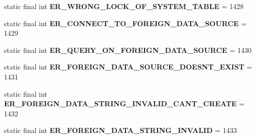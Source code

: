 \begin{DoxyCompactItemize}
\item 
\mbox{\label{classcom_1_1mysql_1_1cj_1_1exceptions_1_1_mysql_error_numbers_aa5a5b3c1b43622de8af2e0ab8a732bf4}} 
static final int {\bfseries E\+R\+\_\+\+W\+R\+O\+N\+G\+\_\+\+L\+O\+C\+K\+\_\+\+O\+F\+\_\+\+S\+Y\+S\+T\+E\+M\+\_\+\+T\+A\+B\+LE} = 1428
\item 
\mbox{\label{classcom_1_1mysql_1_1cj_1_1exceptions_1_1_mysql_error_numbers_a62dc42122c8ce3b2b13b38091908f2ee}} 
static final int {\bfseries E\+R\+\_\+\+C\+O\+N\+N\+E\+C\+T\+\_\+\+T\+O\+\_\+\+F\+O\+R\+E\+I\+G\+N\+\_\+\+D\+A\+T\+A\+\_\+\+S\+O\+U\+R\+CE} = 1429
\item 
\mbox{\label{classcom_1_1mysql_1_1cj_1_1exceptions_1_1_mysql_error_numbers_a312e6f7c54602b3b89f929aec3f971af}} 
static final int {\bfseries E\+R\+\_\+\+Q\+U\+E\+R\+Y\+\_\+\+O\+N\+\_\+\+F\+O\+R\+E\+I\+G\+N\+\_\+\+D\+A\+T\+A\+\_\+\+S\+O\+U\+R\+CE} = 1430
\item 
\mbox{\label{classcom_1_1mysql_1_1cj_1_1exceptions_1_1_mysql_error_numbers_a69e627fa14e975a07d860feca600c799}} 
static final int {\bfseries E\+R\+\_\+\+F\+O\+R\+E\+I\+G\+N\+\_\+\+D\+A\+T\+A\+\_\+\+S\+O\+U\+R\+C\+E\+\_\+\+D\+O\+E\+S\+N\+T\+\_\+\+E\+X\+I\+ST} = 1431
\item 
\mbox{\label{classcom_1_1mysql_1_1cj_1_1exceptions_1_1_mysql_error_numbers_a91a93681ecf1c284d590a4a39cf76afd}} 
static final int {\bfseries E\+R\+\_\+\+F\+O\+R\+E\+I\+G\+N\+\_\+\+D\+A\+T\+A\+\_\+\+S\+T\+R\+I\+N\+G\+\_\+\+I\+N\+V\+A\+L\+I\+D\+\_\+\+C\+A\+N\+T\+\_\+\+C\+R\+E\+A\+TE} = 1432
\item 
\mbox{\label{classcom_1_1mysql_1_1cj_1_1exceptions_1_1_mysql_error_numbers_addf6aa396aefdee2a7c3fd155a901fcf}} 
static final int {\bfseries E\+R\+\_\+\+F\+O\+R\+E\+I\+G\+N\+\_\+\+D\+A\+T\+A\+\_\+\+S\+T\+R\+I\+N\+G\+\_\+\+I\+N\+V\+A\+L\+ID} = 1433
\item 
\mbox{\label{classcom_1_1mysql_1_1cj_1_1exceptions_1_1_mysql_error_numbers_ab8dbea36a151ebebe470eef6b9194ab0}} 

\end{DoxyCompactItemize}

